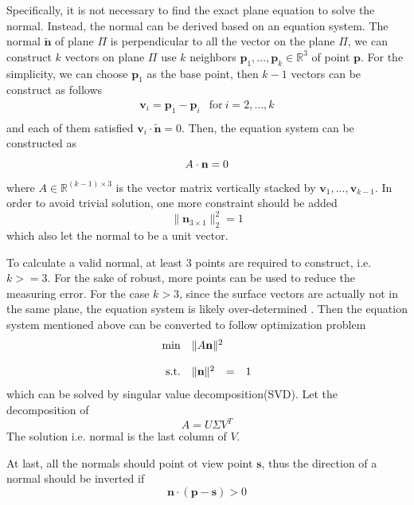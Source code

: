 \documentclass[border=15pt, multi, tikz]{article}
\newcommand{\bn}{\textbf{n}}
\begin{document}
Specifically, it is not necessary to find the exact plane equation to solve the normal. Instead, the normal can be derived based on an equation system. 
The normal $ \tilde{\textbf{n}} $ of plane $ \Pi $ is perpendicular to all the vector on the plane $ \Pi $, we can construct $ k $ vectors on plane $ \Pi $ use  $ k $ neighbors $ \textbf{p}_1, ..., \textbf{p}_k \in \mathbb{R}^3 $ of point $ \textbf{p} $. For the simplicity, we can choose $ \textbf{p}_1 $ as the base point, then $ k-1 $ vectors can be construct as follows
\begin{equation}
	\begin{array}{rr}
		\displaystyle \textbf{v}_i = \textbf{p}_1 - \textbf{p}_i & \text{for}\ i= 2,...,k \\
	\end{array}
\end{equation}
and each of them satisfied $ \textbf{v}_i \cdot \tilde{\textbf{n}} = 0$. Then, the equation system can be constructed as 
\begin{equation}{\label{eq:normal-overdetermined-equation}}
	A \cdot \textbf{n} = 0
\end{equation}
where $ A \in \mathbb{R}^{(k-1)\times 3} $ is the vector matrix vertically stacked by $ \textbf{v}_1, ..., \textbf{v}_{k-1} $.
In order to avoid trivial solution, one more constraint should be added
\[ \|  \bn_{3 \times 1} \|_2^2 = 1  \]
which also let the normal to be a unit vector.

To calculate a valid normal, at least 3 points are required to construct, i.e. $ k>=3 $. For the sake of robust, more points can be used to reduce the measuring error. For the case $ k>3 $, since the surface vectors are actually not in the same plane, the equation system is likely over-determined . Then the equation system mentioned above can be converted to follow optimization problem
\begin{equation}
	\begin{array}{rrclcl}
		\displaystyle \min & \multicolumn{3}{l}{\| A  \bn \|^2} \\
		\\
		\textrm{s.t.} & \| \bn \|^2 & = & 1 
	\end{array}
\end{equation}
which can be solved by singular value decomposition(SVD). Let the decomposition of 
\[ A=U\Sigma V^T \]
The solution i.e. normal is the last column of $ V $.


At last, all the normals should point ot view point $ \textbf{s} $, thus the direction of a normal should be inverted if 
\begin{equation}\label{eq:normal-invertion}
	\textbf{n} \cdot (\textbf{p}  - \textbf{s}) > 0
\end{equation}
\end{document}
